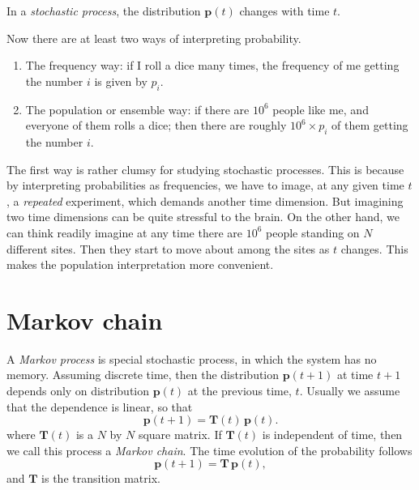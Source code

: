 \documentclass{report}
\begin{document}
In a \emph{stochastic process},
the distribution $\mathbf p(t)$
changes with time $t$.


Now there are at least two ways of
interpreting probability.
%
\begin{enumerate}
  \item
  The frequency way:
  if I roll a dice many times,
  the frequency of me getting the number $i$
  is given by $p_i$.

  \item
  The population or ensemble way:
  if there are $10^6$ people like me,
  and everyone of them rolls a dice;
  then there are roughly $10^6 \times p_i$ of them
  getting the number $i$.

\end{enumerate}


The first way is rather clumsy
for studying stochastic processes.
%
This is because by interpreting probabilities as
frequencies, we have to image, at any given time $t$,
a \emph{repeated} experiment, which demands
another time dimension.
%
But imagining two time dimensions
can be quite stressful to the brain.
%
On the other hand,
we can think readily imagine at any time
there are $10^6$ people standing
on $N$ different sites.
Then they start to move about
among the sites as $t$ changes.
%
This makes the population interpretation
more convenient.



\section{Markov chain}




A \emph{Markov process} is special stochastic process,
in which the system has no memory.
%
Assuming discrete time, then
the distribution $\mathbf p(t+1)$ at time $t + 1$
depends only on distribution
$\mathbf p(t)$ at the previous time, $t$.
%
Usually we assume that the dependence is linear, so that
$$
  \mathbf p(t+1)
  =
  \mathbf T(t) \, \mathbf p(t).
$$
where $\mathbf T(t)$ is a $N$ by $N$ square matrix.
%
If $\mathbf T(t)$ is independent of time,
then we call this process a \emph{Markov chain}.
%
The time evolution of the probability follows
%
\begin{equation}
  \mathbf p(t+1)
  =
  \mathbf T \, \mathbf p(t),
\label{eq:mcp}
\end{equation}
%
and $\mathbf T$ is the transition matrix.
\end{document}
